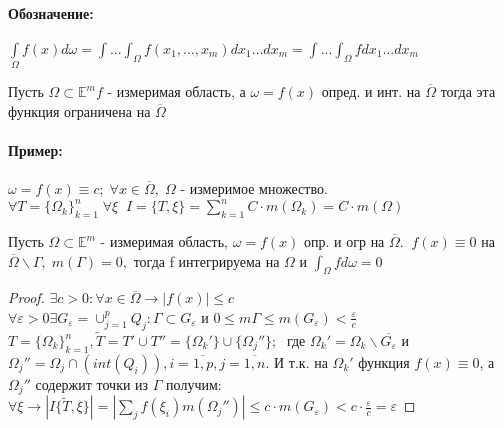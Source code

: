 \paragraph{Обозначение:} $\int\limits_\Omega f(x) d\omega = \int...\int_\Omega f(x_1, \dots, x_m) dx_1\dots dx_m =\int...\int_\Omega f dx_1\dots dx_m   $
\begin{theorem}\vspace{-5pt}
	Пусть $\Omega\subset \mathbb{E}^mf $ - измеримая область, а $\omega = f(x)  $ опред. и инт. на $\overline{\Omega} $ тогда эта функция ограничена на $\overline{\Omega} $
\end{theorem}

\vspace{-10pt}
\paragraph{Пример:} $\omega=f(x)\equiv c; \; \forall x\in \overline{\Omega}, \; \Omega $ - измеримое множество. \\
$\forall T=\{\Omega_k  \}_{k=1}^n \; \forall \xi \;\; I=\{T, \xi \}= \sum_{k=1}^n C\cdot m(\Omega_k) =  C\cdot m(\Omega)$
\vspace{-10pt}
\begin{theorem}
	 Пусть $\Omega\subset \mathbb{E}^m $ - измеримая область, $\omega=f(x)  $ опр. и огр на $\overline{\Omega}. \;\; f(x)\equiv 0 $ на $\overline{\Omega}\backslash \Gamma, \; m(\Gamma)=0, $ тогда f интегрируема на $\Omega$ и $\int_\Omega fd\omega=0 $
\end{theorem}\vspace{-20pt}\begin{proof}
	$\exists c>0 : \forall x\in \overline{\Omega} \rightarrow |f(x)|\leq c $\\
	$\forall \varepsilon>0 \exists G_\varepsilon= \cup_{j=1}^p Q_j : \Gamma \subset G_\varepsilon  $ и $0\leq m\Gamma \leq m(G_\varepsilon) < \frac{ \varepsilon}{c} $\\
	$T=\{\Omega_k  \}_{k=1}^n, \widetilde{T}=T'\cup T'' = \{\Omega_k' \}\cup\{\Omega_j'' \}; \;$  где $\Omega_k'=\Omega_k\backslash \overline{G_\varepsilon}   $ и $\Omega_j''= \Omega_j\cap (int (Q_i)), i=\overline{1,p}, j= \overline{1,n}.$  
	И т.к. на $\Omega_k' $ функция $f(x)\equiv0$, а $\Omega_j'' $ содержит точки из $\Gamma$ получим:\\
	$\forall \xi \rightarrow |I\{\widetilde{T}, \xi \}|= |\sum_j f(\xi_i)m (\Omega_j'') |\leq c\cdot m(G_\varepsilon) < c\cdot \frac{\varepsilon}{c} = \varepsilon $
\end{proof}\vspace{-30pt}
